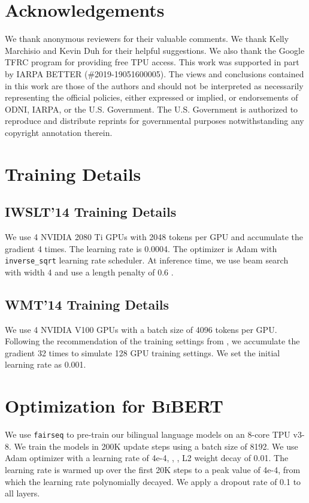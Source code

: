\documentclass[11pt]{article}
\begin{document}
\section*{Acknowledgements}
We thank anonymous reviewers for their valuable comments. We thank Kelly Marchisio and Kevin Duh for their helpful suggestions. We also thank the Google TFRC program for providing free TPU access. This work was supported in part by IARPA BETTER (\#2019-19051600005). The views and conclusions contained in this work are those of the authors and should not be interpreted as necessarily representing the official policies, either expressed or implied, or endorsements of ODNI, IARPA, or the U.S. Government. The U.S. Government is authorized to reproduce and distribute reprints for governmental purposes notwithstanding any copyright annotation therein.




\clearpage

\appendix
\section{Training Details}
\label{app:training}
\subsection{IWSLT'14 Training Details}
We use 4 NVIDIA 2080 Ti GPUs with 2048 tokens per GPU and accumulate the gradient 4 times. The learning rate is 0.0004. The optimizer is Adam \citep{kingma2014adam} with \texttt{inverse\_sqrt} learning rate scheduler. At inference time, we use beam search with width 4 and use a length penalty of 0.6 \citep{boulanger2013audio,wu2016google,koehn-knowles-2017-six}. 

\subsection{WMT'14 Training Details}
We use 4 NVIDIA V100 GPUs with a batch size of 4096 tokens per GPU. Following the recommendation of the training settings from \citet{ott-etal-2018-scaling}, we accumulate the gradient 32 times to simulate 128 GPU training settings. We set the initial learning rate as 0.001.

\section{Optimization for \textsc{BiBERT}}
\label{app:optimization}
We use \texttt{fairseq} to pre-train our bilingual language models on an 8-core TPU v3-8. We train the models in 200K update steps using a batch size of 8192. We use Adam optimizer \citep{kingma2014adam} with a learning rate of 4e-4, , , L2 weight decay of 0.01. The learning rate is warmed up over the first 20K steps to a peak value of 4e-4, from which the learning rate polynomially decayed. We apply a dropout rate of 0.1 to all layers.
\end{document}
